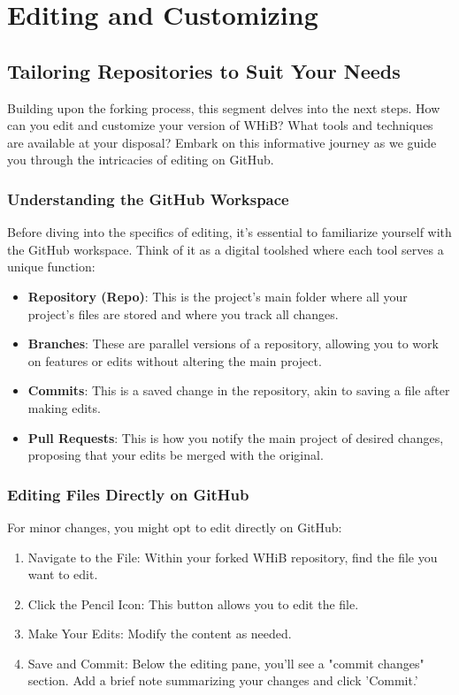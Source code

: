 \documentclass[a4paper,12pt]{book}
\begin{document}
\chapter{Editing and Customizing}
\section*{Tailoring Repositories to Suit Your Needs}
Building upon the forking process, this segment delves into the next steps. How can you edit and customize your version of WHiB? What tools and techniques are available at your disposal? Embark on this informative journey as we guide you through the intricacies of editing on GitHub.

\subsection*{Understanding the GitHub Workspace}
Before diving into the specifics of editing, it's essential to familiarize yourself with the GitHub workspace. Think of it as a digital toolshed where each tool serves a unique function:

\begin{itemize}
    \item \textbf{Repository (Repo)}: This is the project's main folder where all your project's files are stored and where you track all changes.
    \item \textbf{Branches}: These are parallel versions of a repository, allowing you to work on features or edits without altering the main project.
    \item \textbf{Commits}: This is a saved change in the repository, akin to saving a file after making edits.
    \item \textbf{Pull Requests}: This is how you notify the main project of desired changes, proposing that your edits be merged with the original.
\end{itemize}

\subsection*{Editing Files Directly on GitHub}
For minor changes, you might opt to edit directly on GitHub:

\begin{enumerate}
    \item Navigate to the File: Within your forked WHiB repository, find the file you want to edit.
    \item Click the Pencil Icon: This button allows you to edit the file.
    \item Make Your Edits: Modify the content as needed.
    \item Save and Commit: Below the editing pane, you'll see a "commit changes" section. Add a brief note summarizing your changes and click 'Commit.'
\end{enumerate}
\end{document}
